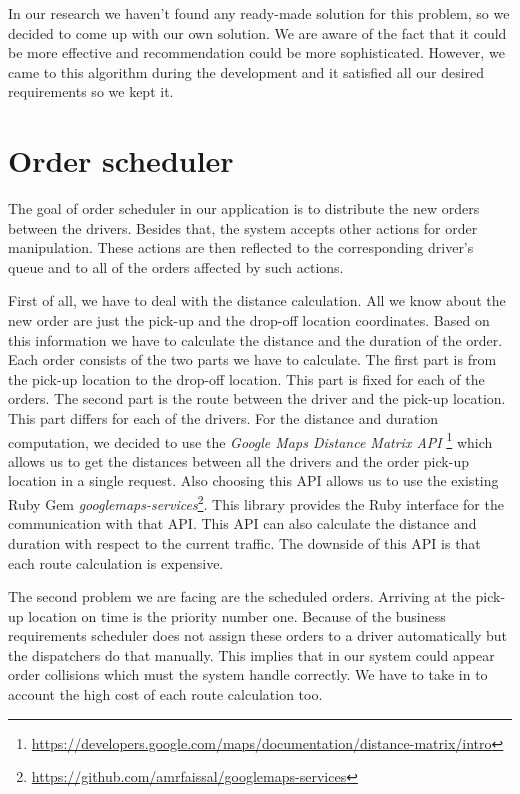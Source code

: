 In our research we haven't found any ready-made solution for this problem, so we decided to come up with our own solution. We are aware of the fact that it could be more effective and recommendation could be more sophisticated. However, we came to this algorithm during the development and it satisfied all our desired requirements so we kept it.

\section {Order scheduler}

The goal of order scheduler in our application is to distribute the new orders between the drivers. Besides that, the system accepts other actions for order manipulation. These actions are then reflected to the corresponding driver's queue and to all of the orders affected by such actions.

First of all, we have to deal with the distance calculation. All we know about the new order are just the pick-up and the drop-off location coordinates. Based on this information we have to calculate the distance and the duration of the order. Each order consists of the two parts we have to calculate. The first part is from the pick-up location to the drop-off location. This part is fixed for each of the orders. The second part is the route between the driver and the pick-up location. This part differs for each of the drivers. For the distance and duration computation, we decided to use the \textit{Google Maps Distance Matrix API} \footnote{\url{https://developers.google.com/maps/documentation/distance-matrix/intro}} which allows us to get the distances between all the drivers and the order pick-up location in a single request. Also choosing this API allows us to use the existing Ruby Gem \textit{googlemaps-services}\footnote{\url{https://github.com/amrfaissal/googlemaps-services}}. This library provides the Ruby interface for the communication with that API. This API can also calculate the distance and duration with respect to the current traffic. The downside of this API is that each route calculation is expensive.

The second problem we are facing are the scheduled orders. Arriving at the pick-up location on time is the priority number one. Because of the business requirements scheduler does not assign these orders to a driver automatically but the dispatchers do that manually. This implies that in our system could appear order collisions which must the system handle correctly. We have to take in to account the high cost of each route calculation too.

